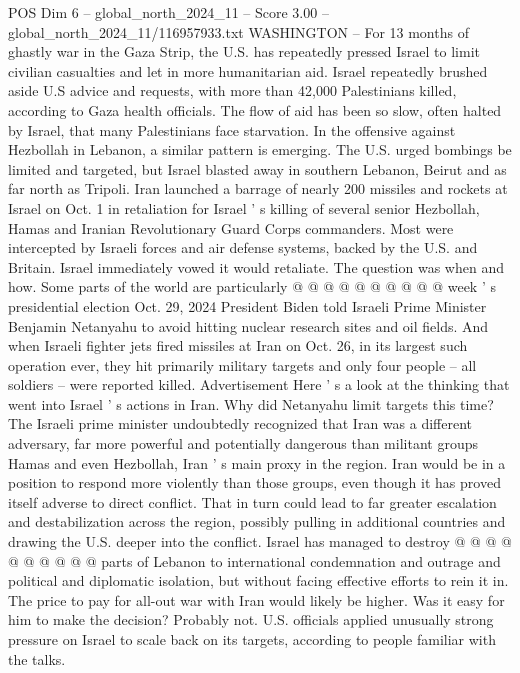 \begin{textsample}{POS Dim 6 – global\_north\_2024\_11 – Score 3.00 – global\_north\_2024\_11/116957933.txt}  \label{ex:f6_pos_358}
WASHINGTON -- For 13 months of ghastly war in the Gaza Strip, the U.S. has repeatedly pressed Israel to limit civilian casualties and let in more humanitarian aid.
Israel repeatedly brushed aside U.S advice and requests, with more than 42,000 Palestinians killed, according to Gaza health officials.
The flow of aid has been so slow, often halted by Israel, that many Palestinians face starvation.
In the offensive against Hezbollah in Lebanon, a similar pattern is emerging.
The U.S. urged bombings be limited and targeted, but Israel blasted away in southern Lebanon, Beirut and as far north as Tripoli.
Iran launched a barrage of nearly 200 missiles and rockets at Israel on Oct. 1 in retaliation for Israel ' s killing of several senior Hezbollah, Hamas and Iranian Revolutionary Guard Corps commanders.
Most were intercepted by Israeli forces and air defense systems, backed by the U.S. and Britain.
Israel immediately vowed it would retaliate.
The question was when and how.
Some parts of the world are particularly @ @ @ @ @ @ @ @ @ @ week ' s presidential election Oct. 29, 2024 President Biden told Israeli Prime Minister Benjamin Netanyahu to avoid hitting nuclear research sites and oil fields.
And when Israeli fighter jets fired missiles at Iran on Oct. 26, in its largest such operation ever, they hit primarily military targets and only four people -- all soldiers -- were reported killed.
Advertisement Here ' s a look at the thinking that went into Israel ' s actions in Iran.
Why did Netanyahu limit targets this time?
The Israeli prime minister undoubtedly recognized that Iran was a different adversary, far more powerful and potentially dangerous than militant groups Hamas and even Hezbollah, Iran ' s main proxy in the region.
Iran would be in a position to respond more violently than those groups, even though it has proved itself adverse to direct conflict.
That in turn could lead to far greater escalation and destabilization across the region, possibly pulling in additional countries and drawing the U.S. deeper into the conflict.
Israel has managed to destroy @ @ @ @ @ @ @ @ @ @ parts of Lebanon to international condemnation and outrage and political and diplomatic isolation, but without facing effective efforts to rein it in.
The price to pay for all-out war with Iran would likely be higher.
Was it easy for him to make the decision?
Probably not.
U.S. officials applied unusually strong pressure on Israel to scale back on its targets, according to people familiar with the talks.

\end{textsample}
